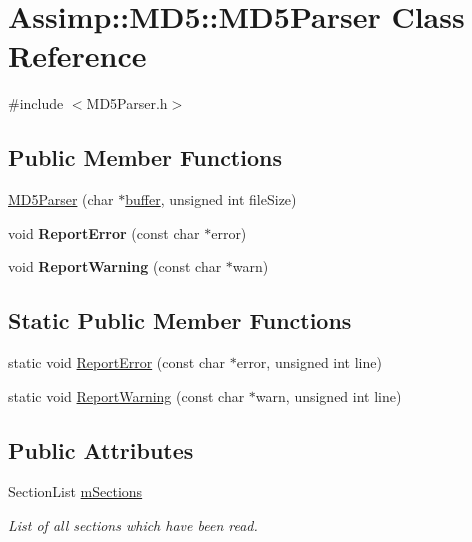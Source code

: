 \hypertarget{class_assimp_1_1_m_d5_1_1_m_d5_parser}{\section{Assimp\+:\+:M\+D5\+:\+:M\+D5\+Parser Class Reference}
\label{class_assimp_1_1_m_d5_1_1_m_d5_parser}
}


{\ttfamily \#include $<$M\+D5\+Parser.\+h$>$}

\subsection*{Public Member Functions}
\begin{DoxyCompactItemize}
\item 
\hyperlink{class_assimp_1_1_m_d5_1_1_m_d5_parser_a4c430ef141991859cf01cad03719c6a0}{M\+D5\+Parser} (char $\ast$\hyperlink{structbuffer}{buffer}, unsigned int file\+Size)
\item 
\hypertarget{class_assimp_1_1_m_d5_1_1_m_d5_parser_a91c4462a956cba866f4a593dd2dc7830}{void {\bfseries Report\+Error} (const char $\ast$error)}\label{class_assimp_1_1_m_d5_1_1_m_d5_parser_a91c4462a956cba866f4a593dd2dc7830}

\item 
\hypertarget{class_assimp_1_1_m_d5_1_1_m_d5_parser_a69fdc805a70e168932544f92312be304}{void {\bfseries Report\+Warning} (const char $\ast$warn)}\label{class_assimp_1_1_m_d5_1_1_m_d5_parser_a69fdc805a70e168932544f92312be304}

\end{DoxyCompactItemize}
\subsection*{Static Public Member Functions}
\begin{DoxyCompactItemize}
\item 
static void \hyperlink{class_assimp_1_1_m_d5_1_1_m_d5_parser_a1449e5901c91fd16186c48b752944c60}{Report\+Error} (const char $\ast$error, unsigned int line)
\item 
static void \hyperlink{class_assimp_1_1_m_d5_1_1_m_d5_parser_a36c97ec2e3054ba9b7fa40b143abdac1}{Report\+Warning} (const char $\ast$warn, unsigned int line)
\end{DoxyCompactItemize}
\subsection*{Public Attributes}
\begin{DoxyCompactItemize}
\item 
\hypertarget{class_assimp_1_1_m_d5_1_1_m_d5_parser_a80f1763d724ad68ac829967e8388ebf4}{Section\+List \hyperlink{class_assimp_1_1_m_d5_1_1_m_d5_parser_a80f1763d724ad68ac829967e8388ebf4}{m\+Sections}}\label{class_assimp_1_1_m_d5_1_1_m_d5_parser_a80f1763d724ad68ac829967e8388ebf4}

\begin{DoxyCompactList}\small\item\em List of all sections which have been read. \end{DoxyCompactList}\end{DoxyCompactItemize}


